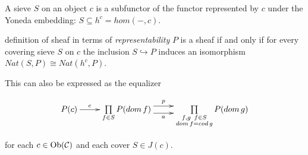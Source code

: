 \begin{frame}
A sieve $S$ on an object $c$ is a subfunctor of the functor represented by $c$ under the Yoneda embedding: $S \subseteq h^c = hom(-,c)$. 
\begin{block}{definition of sheaf in terms of {\it representability}}
$P$ is a sheaf if and only if for every covering sieve $S$ on $c$ the inclusion $S \hookrightarrow P$ induces an isomorphism $Nat(S,P) \cong Nat(h^c,P)$. 
\end{block}
This can also be expressed as the equalizer
\begin{block}{}
\begin{displaymath}
\xymatrix{
P(c) \ar[r]^-{e}
&
\prod\limits_{f \in S}
P(dom \, f)
\ar@<1ex>[r]^-{p} \ar@<-1ex>[r]_-{a}
&
\prod\limits_{\substack{f,g \,\,\, f \in S \\ dom \, f=cod \, g}}
P(dom \, g)
}
\end{displaymath}
\end{block}
for each $c \in \mathop{\rm Ob}\nolimits({\mathcal C})$ and each cover $S \in J(c)$.
\end{frame}